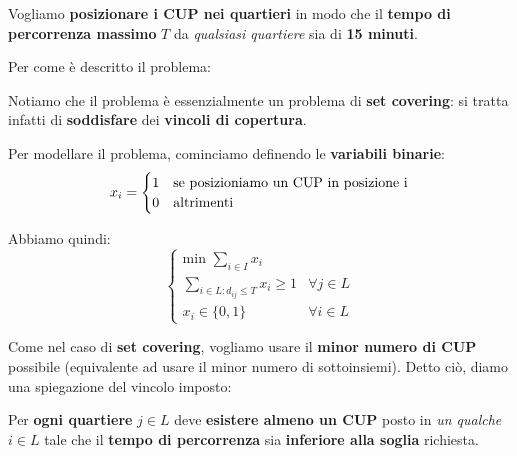 \begin{exa}[PROBLEMA]
    Vogliamo \textbf{posizionare i CUP nei quartieri} in modo che
    il \textbf{tempo di percorrenza massimo} $T$ da \textit{qualsiasi quartiere}
    sia di \textbf{15 minuti}.
\end{exa}

Per come è descritto il problema:

\begin{remark}
    Notiamo che il problema è essenzialmente un problema
    di \textbf{set covering}: si tratta infatti di \textbf{soddisfare} 
    dei \textbf{vincoli di copertura}.
\end{remark}

Per modellare il problema, cominciamo definendo le \textbf{variabili binarie}:
\[
    x_i = \begin{cases}
        1 & \text{se posizioniamo un CUP in posizione } $i$ \\ 
        0 & \text{altrimenti}
    \end{cases}
\]

Abbiamo quindi:
\[
    \begin{cases}
        \displaystyle\text{min } \sum_{i\in I} x_i \\ 
        \displaystyle\sum_{i\in L : d_{ij} \le T} x_i \ge 1 & \forall j \in L \\
        x_i \in \{0,1\} & \forall i \in L
    \end{cases}
\]

Come nel caso di \textbf{set covering}, vogliamo usare il \textbf{minor numero di CUP}
possibile (equivalente ad usare il minor numero di sottoinsiemi).
Detto ciò, diamo una spiegazione del vincolo imposto:

\begin{remark}
    Per \textbf{ogni quartiere} $j\in L$ deve \textbf{esistere almeno un CUP}
    posto in \textit{un qualche} $i\in L$ tale che il \textbf{tempo di percorrenza}
    sia \textbf{inferiore alla soglia} richiesta.
\end{remark}
